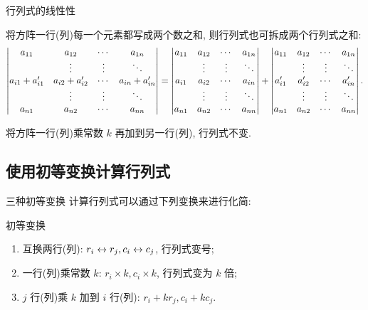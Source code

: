 \begin{frame}{行列式的线性性}
	\onslide<+->
	\begin{alertblock@}
		将方阵一行(列)每一个元素都写成两个数之和, 则行列式也可拆成两个行列式之和:
		\[\left|\begin{matrix}a_{11}&a_{12}&\cdots&a_{1n}\\
		&\vdots&\vdots&\ddots\\
		a_{i1}+a'_{i1}&a_{i2}+a'_{i2}&\cdots&a_{in}+a'_{in}\\
		&\vdots&\vdots&\ddots\\
		a_{n1}&a_{n2}&\cdots&a_{nn}\end{matrix}\right|=\left|\begin{matrix}a_{11}&a_{12}&\cdots&a_{1n}\\
		&\vdots&\vdots&\ddots\\
		a_{i1}&a_{i2}&\cdots&a_{in}\\
		&\vdots&\vdots&\ddots\\
		a_{n1}&a_{n2}&\cdots&a_{nn}\end{matrix}\right|+\left|\begin{matrix}a_{11}&a_{12}&\cdots&a_{1n}\\
		&\vdots&\vdots&\ddots\\
		a'_{i1}&a'_{i2}&\cdots&a'_{in}\\
		&\vdots&\vdots&\ddots\\
		a_{n1}&a_{n2}&\cdots&a_{nn}\end{matrix}\right|.\]
	\end{alertblock@}
	\onslide<+->
	\begin{alertblock@}
		将方阵一行(列)乘常数 $k$ 再加到另一行(列), 行列式不变.
	\end{alertblock@}
\end{frame}


\subsection{使用初等变换计算行列式}
\begin{frame}{三种初等变换}
	\onslide<+->
	计算行列式可以通过下列变换来进行化简:
	\onslide<+->
	\begin{block}{初等变换}
		\begin{enumerate}
		\item 互换两行(列): \alert{$r_i\leftrightarrow r_j, c_i\leftrightarrow c_j$}, 行列式变号;
		\item 一行(列)乘常数 $k$: \alert{$r_i\times k, c_i\times k$}, 行列式变为 $k$ 倍;
		\item $j$ 行(列)乘 $k$ 加到 $i$ 行(列): \alert{$r_i+kr_j, c_i+kc_j$}.
	\end{enumerate}
	\end{block}
\end{frame}


